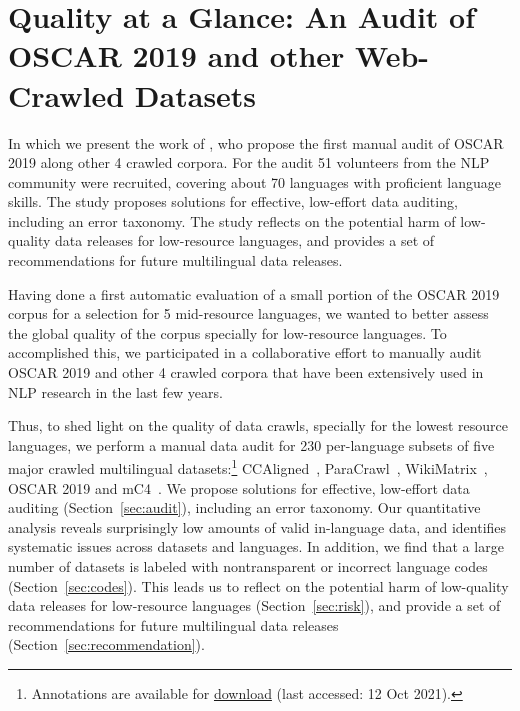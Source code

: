 \chapter{Quality at a Glance: An Audit of OSCAR 2019 and other Web-Crawled Datasets}

\begin{center}
    \begin{minipage}{0.66\textwidth}
        \begin{small}
            In which we present the work of \citet{kreutzer-etal-2021-quality}, who propose the first manual audit of OSCAR 2019 along other 4 crawled corpora. For the audit 51 volunteers from the NLP community were recruited, covering about 70 languages with proficient language skills. The study proposes solutions for effective, low-effort data auditing, including an error taxonomy. The study reflects on the potential harm of low-quality data releases for low-resource languages, and provides a set of recommendations for future multilingual data releases.
        \end{small}
    \end{minipage}
    \vspace{0.5cm}
\end{center}

Having done a first automatic evaluation of a small portion of the OSCAR 2019 corpus for a selection for 5 mid-resource languages, we wanted to better assess the global quality of the corpus specially for low-resource languages. To accomplished this, we participated in a collaborative effort to manually audit OSCAR 2019 and other 4 crawled corpora that have been extensively used in NLP research in the last few years.

Thus, to shed light on the quality of data crawls, specially for the lowest resource languages, we perform a manual data audit for 230 per-language subsets of five major crawled multilingual datasets:\footnote{Annotations are available for \href{https://storage.googleapis.com/huggingface-nlp/datasets/masakhane_audit_annotations/masakhane_language_audit.zip}{download} (last accessed: 12 Oct 2021).}
CCAligned~\citep{el-kishky-etal-2020-ccaligned}, ParaCrawl~\citep{espla-etal-2019-paracrawl,banon-etal-2020-paracrawl}, WikiMatrix~\citep{schwenk-etal-2021-wikimatrix}, OSCAR 2019 \citep{ortiz-suarez-etal-2019-asynchronous, ortiz-suarez-etal-2020-monolingual} and mC4~\citep{xue-etal-2021-mt5}. We propose solutions for effective, low-effort data auditing (Section~\ref{sec:audit}), including an error taxonomy. Our quantitative analysis reveals surprisingly low amounts of valid in-language data, and identifies systematic issues across datasets and languages. In addition, we find that a large number of datasets is labeled with nontransparent or incorrect language codes (Section~\ref{sec:codes}). This leads us to reflect on the potential harm of low-quality data releases for low-resource languages (Section~\ref{sec:risk}), and provide a set of recommendations for future multilingual data releases (Section~\ref{sec:recommendation}).


